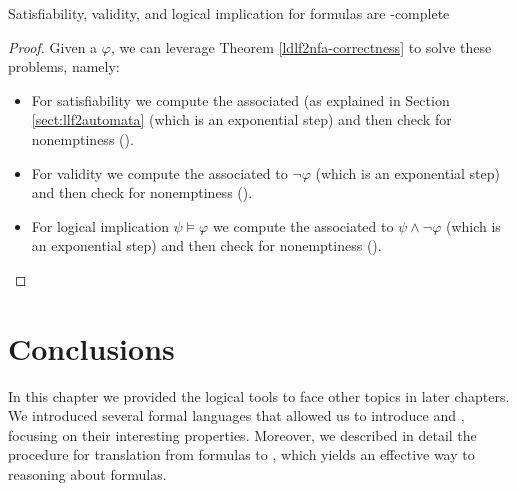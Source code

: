 \begin{theorem} Satisfiability, validity, and logical implication for \LDLf formulas are \PSPACE-complete
\end{theorem}
\begin{proof}
	Given a \LLf $\varphi$, we can leverage Theorem \ref{ldlf2nfa-correctness} to solve these problems, namely:
	\begin{itemize}
		\item For \LLf satisfiability we compute the associated \NFA (as explained in Section \ref{sect:llf2automata} (which is an exponential step) and then check \NFA for nonemptiness (\NLOGSPACE).
		\item For \LLf validity we compute the \NFA associated to $\lnot \varphi$ (which is an exponential step) and then check \NFA for nonemptiness (\NLOGSPACE).
		\item For \LLf logical implication $\psi \models \varphi$ we compute the \NFA associated to $\psi \wedge \lnot \varphi$ (which is an exponential step) and then check \NFA for nonemptiness (\NLOGSPACE).
	\end{itemize}
\end{proof}


\section{Conclusions}
In this chapter we provided the logical tools to face other topics in later chapters. We introduced several formal languages that allowed us to introduce \LTLf and \LDLf, focusing on their interesting properties. Moreover, we described in detail the procedure for translation from \LLf formulas to \DFAs, which yields an effective way to reasoning about \LLf formulas.
